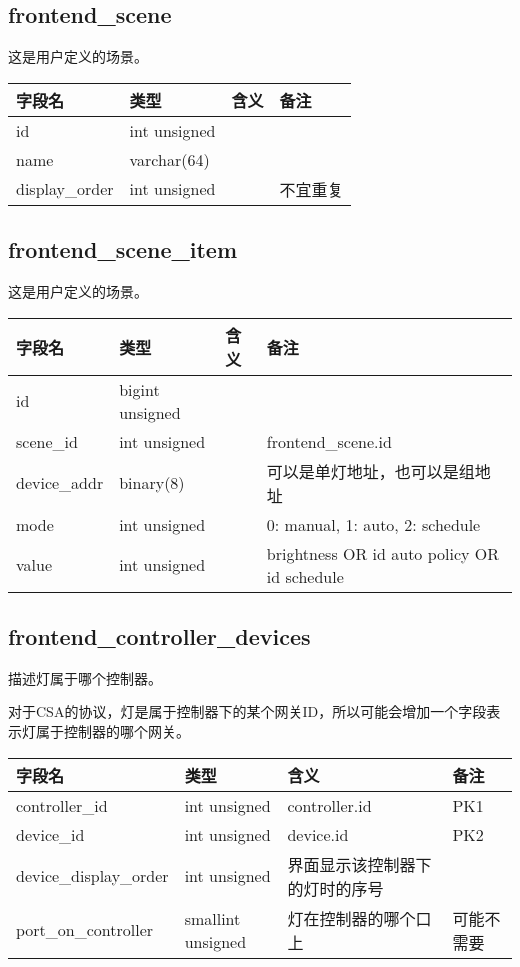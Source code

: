 \subsection{frontend\_scene}\label{frontendux5fscene}

这是用户定义的场景。

\begin{longtabu}[c]{@{}lXXX@{}}
\toprule
字段名 & 类型 & 含义 & 备注\tabularnewline
\midrule
\endhead
id & int unsigned & &\tabularnewline
name & varchar(64) & &\tabularnewline
display\_order & int unsigned & & 不宜重复\tabularnewline
\bottomrule
\end{longtabu}

\subsection{frontend\_scene\_item}\label{frontendux5fsceneux5fitem}

这是用户定义的场景。

\begin{longtabu}[c]{@{}lXXX@{}}
\toprule
字段名 & 类型 & 含义 & 备注\tabularnewline
\midrule
\endhead
id & bigint unsigned & &\tabularnewline
scene\_id & int unsigned & & frontend\_scene.id\tabularnewline
device\_addr & binary(8) & &
可以是单灯地址，也可以是组地址\tabularnewline
mode & int unsigned & & 0: manual, 1: auto, 2: schedule\tabularnewline
value & int unsigned & & brightness OR id auto policy OR id
schedule\tabularnewline
\bottomrule
\end{longtabu}

\subsection{frontend\_controller\_devices}\label{frontendux5fcontrollerux5fdevices}

描述灯属于哪个控制器。

对于CSA的协议，灯是属于控制器下的某个网关ID，所以可能会增加一个字段表示灯属于控制器的哪个网关。

\begin{longtabu}[c]{@{}lXXX@{}}
\toprule
字段名 & 类型 & 含义 & 备注\tabularnewline
\midrule
\endhead
controller\_id & int unsigned & controller.id & PK1\tabularnewline
device\_id & int unsigned & device.id & PK2\tabularnewline
device\_display\_order & int unsigned & 界面显示该控制器下的灯时的序号
&\tabularnewline
port\_on\_controller & smallint unsigned & 灯在控制器的哪个口上 &
可能不需要\tabularnewline
\bottomrule
\end{longtabu}

